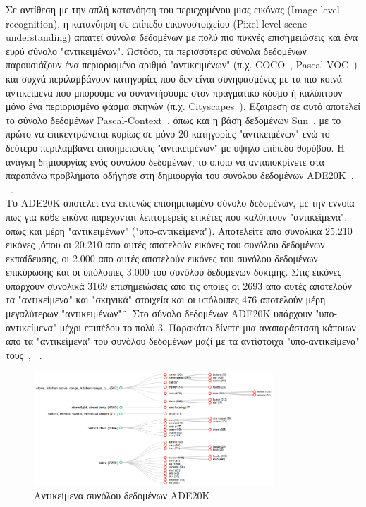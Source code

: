 \documentclass[12pt]{article}
\numberwithin{equation}{section}
\begin{document}
Σε αντίθεση με την απλή κατανόηση του περιεχομένου μιας εικόνας (Image-level recognition), η κατανόηση σε επίπεδο εικονοστοιχείου (Pixel level scene understanding) απαιτεί σύνολα δεδομένων με πολύ πιο πυκνές επισημειώσεις και ένα ευρύ σύνολο "αντικειμένων". Ωστόσο, τα περισσότερα σύνολα δεδομένων παρουσιάζουν ένα περιορισμένο αριθμό "αντικειμένων" (π.χ. COCO~\cite{lin2015microsoftcococommonobjects}, Pascal VOC~\cite{Everingham2010}) και συχνά περιλαμβάνουν κατηγορίες που δεν είναι συνηφασμένες με τα πιο κοινά αντικείμενα που μπορούμε να συναντήσουμε στον πραγματικό κόσμο ή καλύπτουν μόνο ένα περιορισμένο φάσμα σκηνών (π.χ. Cityscapes~\cite{DBLP:journals/corr/CordtsORREBFRS16}). Εξαιρεση σε αυτό αποτελεί το σύνολο δεδομένων Pascal-Context~\cite{6909514}, όπως και η βάση δεδομένων Sun~\cite{5539970}, με το πρώτο να επικεντρώνεται κυρίως σε μόνο 20 κατηγορίες "αντικειμένων" ενώ το δεύτερο περιλαμβάνει επισημειώσεις "αντικειμένων" με υψηλό επίπεδο θορύβου. Η ανάγκη δημιουργίας ενός συνόλου δεδομένων, το οποίο να ανταποκρίνετε στα παραπάνω προβλήματα οδήγησε στη δημιουργία του συνόλου δεδομένων ADE20K~\cite{8100027}, ~\cite{zhou2018semanticunderstandingscenesade20k}. \\

Το ADE20K αποτελεί ένα εκτενώς επισημειωμένο σύνολο δεδομένων, με την έννοια πως για κάθε εικόνα παρέχονται λεπτομερείς ετικέτες που καλύπτουν "αντικείμενα", όπως και μέρη "αντικειμένων" ("υπο-αντικείμενα"). Αποτελείτε απο συνολικά 25.210 εικόνες ,όπου οι 20.210 απο αυτές αποτελούν εικόνες του συνόλου δεδομένων εκπαίδευσης,  οι 2.000 απο αυτές αποτελούν εικόνες του συνόλου δεδομένων επικύρωσης και οι υπόλοιπες 3.000 του συνόλου δεδομένων δοκιμής. Στις εικόνες υπάρχουν συνολικά 3169 επισημειώσεις απο τις οποίες οι 2693 απο αυτές αποτελούν τα "αντικείμενα" και "σκηνικά" στοιχεία και οι υπόλοιπες 476 αποτελούν μέρη μεγαλύτερων "αντικειμένων"¨. Στο σύνολο δεδομένων ADE20K υπάρχουν "υπο-αντικείμενα" μέχρι επιπέδου το πολύ 3. Παρακάτω δίνετε μια αναπαράσταση κάποιων απο τα "αντικείμενα" του συνόλου δεδομένων μαζί με τα αντίστοιχα "υπο-αντικείμενα" τους~\cite{8100027}, ~\cite{zhou2018semanticunderstandingscenesade20k}. \\

\begin{figure}[h!]
  \centering
  \includegraphics[width=0.8\textwidth]{images/ADE20K_objects.png} %
  \caption{Αντικείμενα συνόλου δεδομένων ADE20K}
  \label{figure 8}
\end{figure}
\end{document}
